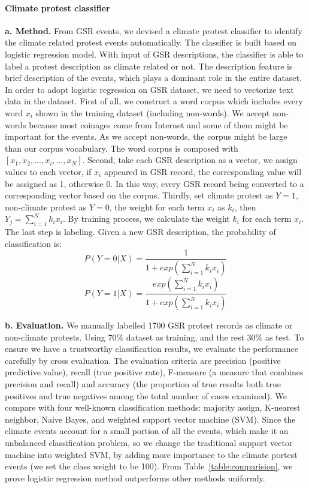 \documentclass[9pt,twocolumn,twoside]{pnas-new}
\begin{document}
{\paragraph{Climate protest classifier}
\textbf{a. Method.} From GSR events, we devised a climate protest classifier to identify the climate related protest events automatically. The classifier is built based on logistic regression model. With input of GSR descriptions, the classifier is able to label a protest description as climate related or not.
The description feature is brief description of the events, which plays a dominant role in the entire dataset. In order to adopt logistic regression on GSR dataset, we need to vectorize text data in the dataset. First of all, we construct a word corpus which includes every word $x_i$ shown in the training dataset (including non-words). We accept non-words because most coinages come from Internet and some of them might be important for the events. As we accept non-words, the corpus might be large than our corpus vocabulary. The word corpus is composed with $[x_1, x_2, ..., x_i, ..., x_N]$.
Second, take each GSR description as a vector, we assign values to each vector, if $x_i$ appeared in GSR record, the corresponding value will be assigned as 1, otherwise 0. In this way, every GSR record being converted to a corresponding vector based on the corpus. Thirdly, set climate protest as $Y=1$, non-climate protest as $Y=0$, the weight for each term $x_i$ as $k_i$, then $Y_j = \sum_{i=1}^{N} k_i x_i $. By training process, we calculate the weight $k_i$ for each term $x_i$. The last step is labeling. Given a new GSR description, the probability of classification is:
$$P(Y = 0| X)= \frac{1}{1+exp( {\sum_{i=1}^{N} k_ix_i})}$$
$$P(Y = 1| X)= \frac{exp( {\sum_{i=1}^{N} k_ix_i})}{1+exp( {\sum_{i=1}^{N} k_ix_i})}$$


\textbf{b. Evaluation.}
We manually labelled 1700 GSR protest records as climate or non-climate protests. Using 70\% dataset as training, and the rest 30\% as test. To ensure we have a trustworthy classification results, we evaluate the performance carefully by cross evaluation. The evaluation criteria are precision (positive predictive value), recall (true positive rate), F-measure (a measure that combines precision and recall) and accuracy (the proportion of true results both true positives and true negatives among the total number of cases examined). We compare with four well-known classification methods: majority assign, K-nearest neighbor, Naive Bayes, and weighted support vector machine (SVM). Since the climate events account for a small portion of all the events, which make it an unbalanced classification problem, so we change the traditional support vector machine into weighted SVM, by adding more importance to the climate portest events (we set the class weight to be 100). From Table~\ref{table:comparision}, we prove logistic regression method outperforms other methods uniformly.

}
\end{document}
